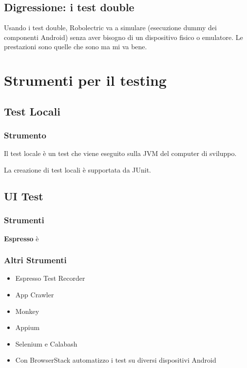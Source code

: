 \subsection{Digressione: i test double}
\par Usando i test double, Robolectric va a simulare (esecuzione dummy dei componenti Android) senza aver bisogno di un dispositivo fisico o emulatore. Le prestazioni sono quelle che sono ma mi va bene.

\section{Strumenti per il testing}
\subsection{Test Locali}
\subsubsection{Strumento}
\par Il test locale è un test che viene eseguito sulla JVM del computer di sviluppo.
\par La creazione di test locali è supportata da JUnit.
\subsection{UI Test}
\subsubsection{Strumenti}
\par \textbf{Espresso} è

\subsubsection{Altri Strumenti}
\begin{itemize}
    \item Espresso Test Recorder
    \item App Crawler
    \item Monkey
    \item Appium
    \item Selenium e Calabash
    \item Con BrowserStack automatizzo i test su diversi dispositivi Android 
\end{itemize}

